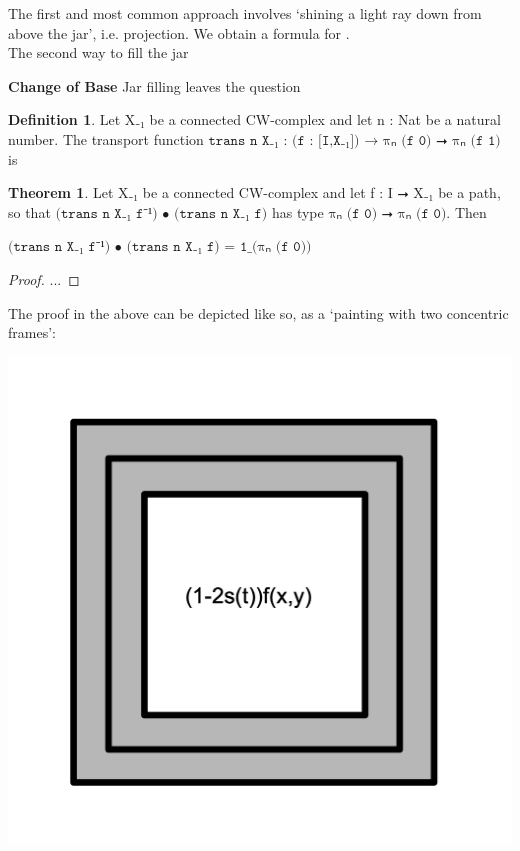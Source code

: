 \documentclass{book}
\theoremstyle{definition}
\newtheorem{definition}{Definition}
\newtheorem{theorem}{Theorem}
\begin{document}
The first and most common approach involves `shining a light ray down from above the jar', i.e. projection. We obtain a formula for .\\

The second way to fill the jar




{\bf Change of Base} Jar filling leaves the question

\begin{definition}
Let X₋₁ be a connected CW-complex and let n : Nat be a natural number. The transport function $\texttt{trans\ n\ X₋₁ : (f : [I,X₋₁])  → πₙ (f 0) ⭢ πₙ (f 1)}$ is 
\end{definition}

\begin{theorem}
Let X₋₁ be a connected CW-complex and let f : I ⭢ X₋₁ be a path, so that $\texttt{(trans\ n X₋₁ f⁻¹) • (trans\ n X₋₁ f)}$ has type $\texttt{πₙ (f 0) ⭢ πₙ (f 0)}$. Then
\begin{center}
$\texttt{(trans\ n X₋₁ f⁻¹) • (trans\ n X₋₁ f) = 1\_(πₙ (f 0))}$
\end{center}
\end{theorem}

\begin{proof}
...
\end{proof}

The proof in the above can be depicted like so, as a `painting with two concentric frames':

\begin{center}
\includegraphics[scale=0.5]{windowframe.png}
\end{center}
\end{document}
